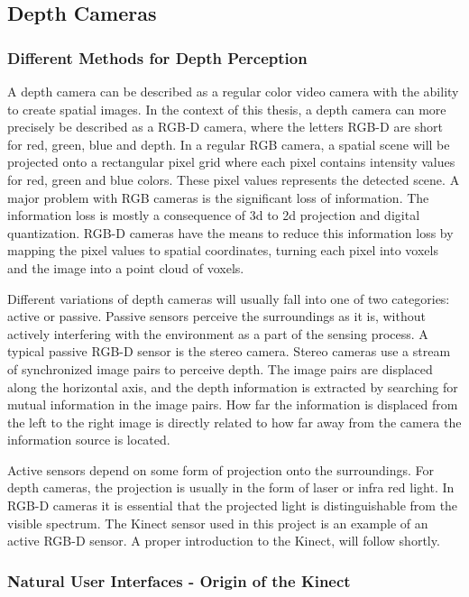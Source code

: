 \subsection{Depth Cameras}

\subsubsection{Different Methods for Depth Perception}

A depth camera can be described as a regular color video camera with the ability to create spatial images. In the context of this thesis, a depth camera can  more precisely be described as a RGB-D camera, where the letters RGB-D are short for red, green, blue and depth. In a regular RGB camera, a spatial scene will be projected onto a rectangular pixel grid where each pixel contains intensity values for red, green and blue colors. These pixel values represents the detected scene. A major problem with RGB cameras is the significant loss of information. The information loss is mostly a consequence of 3d to 2d projection and digital quantization. RGB-D cameras have the means to reduce this information loss by mapping the pixel values to spatial coordinates, turning each pixel into voxels and the image into a point cloud of voxels. 

Different variations of depth cameras will usually fall into one of two categories: active or passive. Passive sensors perceive the surroundings as it is, without actively interfering with the environment as a part of the sensing process. A typical passive RGB-D sensor is the stereo camera. Stereo cameras use a stream of synchronized image pairs to perceive depth. The image pairs are displaced along the horizontal axis, and the depth information is extracted by searching for mutual information in the image pairs. How far the information is displaced from the left to the right image is directly related to how far away from the camera the information source is located. 

Active sensors depend on some form of projection onto the surroundings. For depth cameras, the projection is usually in the form of laser or infra red light. In RGB-D cameras it is essential that the projected light is distinguishable from the visible spectrum. The Kinect sensor used in this project is an example of an active RGB-D sensor. A proper introduction to the Kinect, will follow shortly.

\subsubsection{Natural User Interfaces - Origin of the Kinect}

